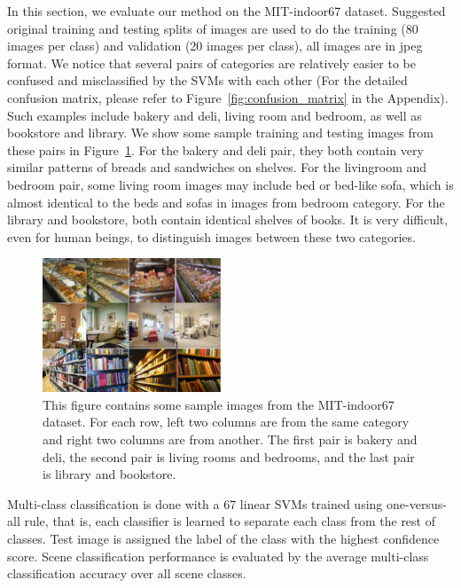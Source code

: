 
In this section, we evaluate our method on the MIT-indoor67 dataset. Suggested
original training and testing splits of images are used to do the training
(80 images per class) and validation (20 images per class), all images are in 
jpeg format. We notice that several pairs of categories are relatively easier
to be confused and misclassified by the SVMs with each other (For the detailed
confusion matrix, please refer to Figure~\ref{fig:confusion_matrix}
in the Appendix). Such examples include bakery and deli, living room and bedroom,
as well as bookstore and library. We show some sample training and testing images
from these pairs in Figure~\ref{fig:sample}. For the bakery and deli pair, they
both contain very similar patterns of breads and sandwiches on shelves. For the
livingroom and bedroom pair, some living room images may include bed or bed-like
sofa, which is almost identical to the beds and sofas in images from bedroom
category. For the library and bookstore, both contain identical shelves of books.
It is very difficult, even for human beings, to distinguish images between these
two categories.

\begin{figure}[ht]
  \centering
  \includegraphics[width=0.475\textwidth]{img/dataset.pdf}
  \centering
  \caption{This figure contains some sample images from the MIT-indoor67 dataset.
For each row, left two columns are from the same category and right two columns
are from another. The first pair is bakery and deli, the second pair is living
rooms and bedrooms, and the last pair is library and bookstore.}
\label{fig:sample}
\end{figure}

Multi-class classification is done with a 67 linear SVMs trained using
one-versus-all rule, that is, each classifier is learned to separate each class
from the rest of classes. Test image is assigned the label of the class with the
highest confidence score. Scene classification performance is evaluated by the
average multi-class classification accuracy over all scene classes.

